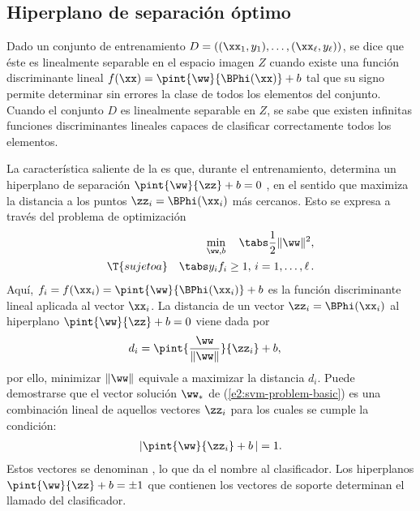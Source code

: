 %
%
\subsection{Hiperplano de separación óptimo}
%
Dado un conjunto de entrenamiento
$D=\left((\xx_1,y_1),\ldots,(\xx_\ell,y_\ell)\right)$, se dice que
éste es linealmente separable en el espacio imagen $Z$ cuando existe
una función discriminante lineal
$f(\xx)=\pint{\ww}{\BPhi(\xx)}+b$ tal que su signo
permite determinar sin errores la clase de todos los elementos del
conjunto.
Cuando el conjunto $D$ es linealmente separable en $Z$, se sabe que
existen infinitas funciones discriminantes lineales capaces de
clasificar correctamente todos los elementos.

La característica saliente de la \MVS{} es que, durante el
entrenamiento, determina un hiperplano de separación
$\pint{\ww}{\zz}+b=0$ , en el sentido que maximiza la
distancia a los puntos $\zz_i=\BPhi(\xx_i)$ más cercanos.
Esto se expresa a través del problema de optimización
%
\begin{equation}\label{e2:svm-problem-basic}
  \begin{aligned}
    \min_{\ww,b} \quad\tabs \frac{1}{2}\|\ww\|^2, \\
    \T{sujeto a}\quad\tabs y_i f_i\geq1,\,i=1,\ldots,\ell\,.
  \end{aligned}
\end{equation}
%
Aquí, $f_i=f(\xx_i)=\pint{\ww}{\BPhi(\xx_i)}+b$ es la
función discriminante lineal aplicada al vector $\xx_i$.
La distancia de un vector $\zz_i=\BPhi(\xx_i)$ al hiperplano
$\pint{\ww}{\zz}+b=0$ viene dada por
%
\begin{align*}
  d_i&=\pint{\frac{\ww}{\|\ww\|}}{\zz_i}+b,
\end{align*}
%
por ello, minimizar $\|\ww\|$ equivale a maximizar la distancia $d_i$.
Puede demostrarse que el vector solución $\ww_*$ de
(\ref{e2:svm-problem-basic}) es una combinación lineal de aquellos
vectores $\zz_i$ para los cuales se cumple la condición:
%
\begin{align*}
  |\pint{\ww}{\zz_i}+b\,|=1.
\end{align*}
%
Estos vectores se denominan , lo que da el
nombre al clasificador.
Los hiperplanos $\pint{\ww}{\zz}+b=\pm1$ que contienen los vectores de
soporte determinan el llamado  del clasificador.
%
%
